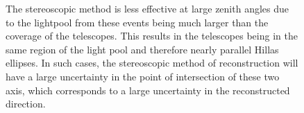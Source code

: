 \documentclass[main.tex]{subfiles}
\begin{document}
\begin{figure}[htbp]
  \centering
  \caption[Stereoscopic reconstruction at LZA]{The stereoscopic method is less effective at large zenith angles due to the lightpool from these events being much larger than the coverage of the telescopes. This results in the telescopes being in the same region of the light pool and therefore nearly parallel Hillas ellipses. In such cases, the stereoscopic method of reconstruction will have a large uncertainty in the point of intersection of these two axis, which corresponds to a large uncertainty in the reconstructed direction.}
  \label{fig:LZA_lightpool}
\end{figure}
\end{document}
